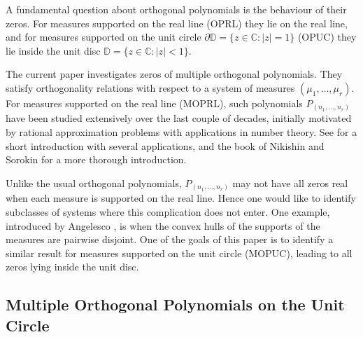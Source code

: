 \documentclass[reqno,centertags,11pt,draft]{amsart}
\newcommand{\C}{\mathbb C}
\newcommand{\D}{\mathbb{D}}
\renewcommand{\d}{\partial}
\begin{document}
A fundamental question about orthogonal polynomials is the behaviour of their zeros. For measures supported on the real line (OPRL) they lie on the real line, and for measures supported on the unit circle $\d\D = \{z\in \C: |z|=1\}$ (OPUC) they lie inside the unit disc $\D = \{z\in \C: |z|<1\}$. 

The current paper investigates zeros of multiple orthogonal polynomials. They satisfy orthogonality relations with respect to a system of measures $(\mu_1,\ldots,\mu_r)$. For measures supported on the real line (MOPRL), such polynomials $P_{(n_1,\ldots,n_r)}$ have been studied extensively over the last couple of decades, initially motivated by rational approximation problems with applications in number theory. See \cite{Applications} for a short introduction with several applications, and the book of Nikishin and Sorokin \cite{bookNS} for a more thorough introduction. 

Unlike the usual orthogonal polynomials, $P_{(n_1,\dots,n_r)}$ may not have all zeros real when each measure is supported on the real line. Hence one would like to identify subclasses of systems where this complication does not enter. One example, introduced by Angelesco \cite{Angelesco}, is when the convex hulls of the supports of the measures are pairwise disjoint. One of the goals of this paper is to identify a similar result for measures supported on the unit circle (MOPUC), leading to all zeros lying inside the unit disc. 


\subsection{Multiple Orthogonal Polynomials on the Unit Circle}
\end{document}
